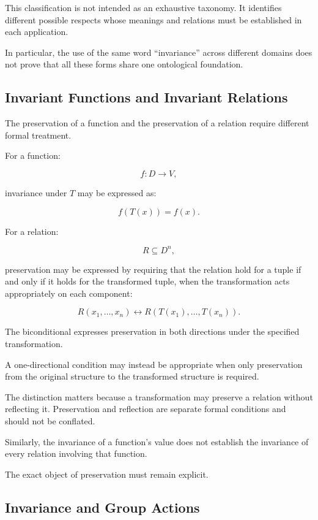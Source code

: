 This classification is not intended as an exhaustive
taxonomy. It identifies different possible respects
whose meanings and relations must be established
in each application.

In particular, the use of the same word
``invariance'' across different domains does not
prove that all these forms share one ontological
foundation.

\subsection{Invariant Functions and Invariant Relations}

The preservation of a function and the preservation
of a relation require different formal treatment.

For a function:

\[
    f : D \rightarrow V,
\]

invariance under \(T\) may be expressed as:

\[
    f(T(x)) = f(x).
\]

For a relation:

\[
    R \subseteq D^n,
\]

preservation may be expressed by requiring that
the relation hold for a tuple if and only if it
holds for the transformed tuple, when the
transformation acts appropriately on each component:

\[
    R(x_1,\ldots,x_n)
    \leftrightarrow
    R(T(x_1),\ldots,T(x_n)).
\]

The biconditional expresses preservation in both
directions under the specified transformation.

A one-directional condition may instead be
appropriate when only preservation from the
original structure to the transformed structure
is required.

The distinction matters because a transformation
may preserve a relation without reflecting it.
Preservation and reflection are separate formal
conditions and should not be conflated.

Similarly, the invariance of a function's value
does not establish the invariance of every relation
involving that function.

The exact object of preservation must remain
explicit.

\subsection{Invariance and Group Actions}

